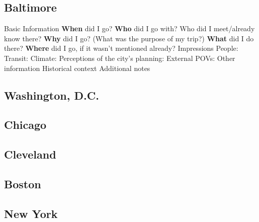 \documentclass{article}
\begin{document}
    \subsection{Baltimore}
    \begin{outline}
        \1 Basic Information
            \2 \textbf{When} did I go?
            \2 \textbf{Who} did I go with? Who did I meet/already know there?
            \2 \textbf{Why} did I go? (What was the purpose of my trip?)
            \2 \textbf{What} did I do there?
            \2 \textbf{Where} did I go, if it wasn't mentioned already?
        \1 Impressions
            \2 People: 
            \2 Transit:
            \2 Climate:
            \2 Perceptions of the city's planning:
            \2 External POVs:
        \1 Other information 
            \2 Historical context
            \2 Additional notes 
    \end{outline}
    \subsection{Washington, D.C.}
    \begin{outline}
        
    \end{outline}
    \subsection{Chicago}
    \begin{outline}
        
    \end{outline}
    \subsection{Cleveland}
    \begin{outline}
        
    \end{outline}
    \subsection{Boston}
    \begin{outline}
        
    \end{outline}
    \subsection{New York}
    \begin{outline}
        
    \end{outline}
\end{document}
